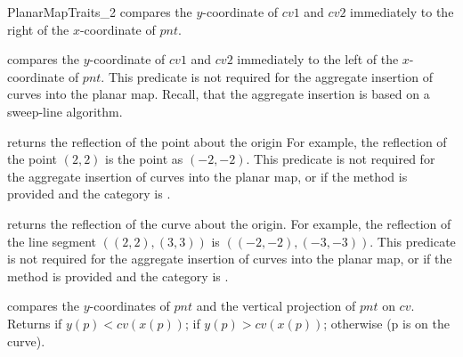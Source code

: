 \begin{ccRefConcept}{PlanarMapTraits_2}
         {compares the $y$-coordinate of $cv1$ and $cv2$ immediately to the
	   right of the $x$-coordinate of $pnt$.
           }
    
         {compares the $y$-coordinate of $cv1$ and $cv2$ immediately to the
           left of the $x$-coordinate of $pnt$. This predicate is not
	   required for the aggregate insertion of curves into the planar map.
	   Recall, that the aggregate insertion is based on a sweep-line
	   algorithm.
           }
    
         {returns the reflection of the point  about the origin
	   For example, the reflection of the point $(2,2)$ is the point as
	   $(-2,-2)$. This predicate is not required for the aggregate
	   insertion of curves into the planar map, or if the method
	    is provided and
	   the  category is .}
	   
         {returns the reflection of the curve  about the origin.
          For example, the reflection of the line segment $((2,2),(3,3))$
	  is $((-2,-2),(-3,-3))$. This predicate is not required for the
	  aggregate insertion of curves into the planar map, or if the method
	   is provided and the
	   category is .}

         {compares the $y$-coordinates of $pnt$ and the vertical projection of
	   $pnt$ on $cv$. Returns  if $y(p) < cv(x(p))$;
	    if $y(p) > cv(x(p))$;
	    otherwise (p is on the curve).
           }


\end{ccRefConcept}
